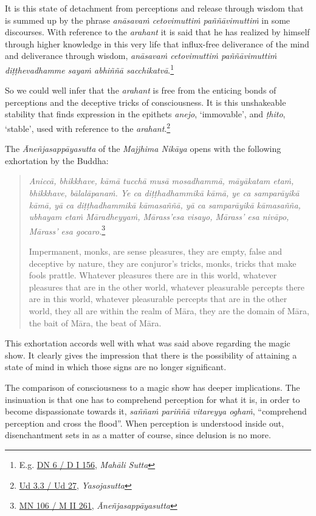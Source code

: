 It is this state of detachment from perceptions and release through wisdom that is summed up by the phrase \emph{anāsavaṁ cetovimuttiṁ paññāvimuttiṁ} in some discourses. With reference to the \emph{arahant} it is said that he has realized by himself through higher knowledge in this very life that influx-free deliverance of the mind and deliverance through wisdom, \emph{anāsavaṁ cetovimuttiṁ paññāvimuttiṁ diṭṭhevadhamme sayaṁ abhiññā sacchikatvā}.\footnote{E.g. \href{https://suttacentral.net/dn6/pli/ms}{DN 6 / D I 156}, \emph{Mahāli Sutta}}

So we could well infer that the \emph{arahant} is free from the enticing bonds of perceptions and the deceptive tricks of consciousness. It is this unshakeable stability that finds expression in the epithets \emph{anejo}, `immovable', and \emph{ṭhito}, `stable', used with reference to the \emph{arahant}.\footnote{\href{https://suttacentral.net/ud3.3/pli/ms}{Ud 3.3 / Ud 27}, \emph{Yasojasutta}}

The \emph{Āneñjasappāyasutta} of the \emph{Majjhima Nikāya} opens with the following exhortation by the Buddha:

\begin{quote}
\emph{Aniccā, bhikkhave, kāmā tucchā musā mosadhammā, māyākatam etaṁ, bhikkhave, bālalāpanaṁ. Ye ca diṭṭhadhammikā kāmā, ye ca samparāyikā kāmā, yā ca diṭṭhadhammikā kāmasaññā, yā ca samparāyikā kāmasañña, ubhayam etaṁ Māradheyyaṁ, Mārass'esa visayo, Mārass' esa nivāpo, Mārass' esa gocaro.}\footnote{\href{https://suttacentral.net/mn106/pli/ms}{MN 106 / M II 261}, \emph{Āneñjasappāyasutta}}

Impermanent, monks, are sense pleasures, they are empty, false and deceptive by nature, they are conjuror's tricks, monks, tricks that make fools prattle. Whatever pleasures there are in this world, whatever pleasures that are in the other world, whatever pleasurable percepts there are in this world, whatever pleasurable percepts that are in the other world, they all are within the realm of Māra, they are the domain of Māra, the bait of Māra, the beat of Māra.
\end{quote}

This exhortation accords well with what was said above regarding the magic show. It clearly gives the impression that there is the possibility of attaining a state of mind in which those signs are no longer significant.

The comparison of consciousness to a magic show has deeper implications. The insinuation is that one has to comprehend perception for what it is, in order to become dispassionate towards it, \emph{saññaṁ pariññā vitareyya oghaṁ}, ``comprehend perception and cross the flood''. When perception is understood inside out, disenchantment sets in as a matter of course, since delusion is no more.

